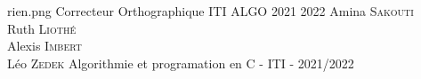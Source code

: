 \documentclass[11pt,a4paper]{article}
\begin{document}
\PageDeGarde	
{rien.png} %
{Correcteur Orthographique} %
{ITI ALGO 2021 2022} %
{Amina \textsc{Sakouti}\\Ruth \textsc{Liothé}\\ Alexis \textsc{Imbert} \\Léo \textsc{Zedek}} %
{Algorithmie et programation en C - ITI - 2021/2022} %



\tableofcontents
\newpage
\end{document}
